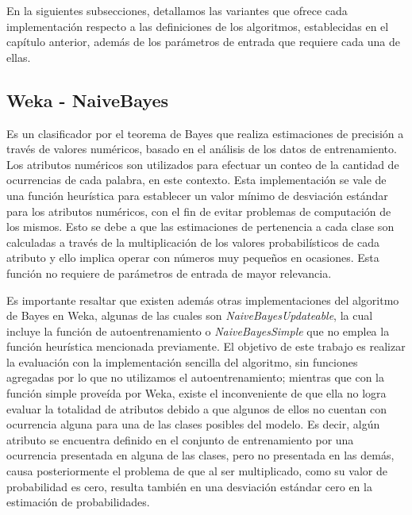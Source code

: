 En la siguientes subsecciones, detallamos las variantes que ofrece cada implementaci\'on respecto a las definiciones de los algoritmos, establecidas en el cap\'itulo anterior, adem\'as de los par\'ametros de entrada que requiere cada una de ellas.

\subsection{Weka - NaiveBayes}

Es un clasificador por el teorema de Bayes que realiza estimaciones de precisi\'on a trav\'es de valores num\'ericos, basado en el an\'alisis de los datos de entrenamiento. Los atributos num\'ericos son utilizados para efectuar un conteo de la cantidad de ocurrencias de cada palabra, en este contexto.  Esta implementaci\'on se vale de una funci\'on heur\'istica para establecer un valor m\'inimo de desviaci\'on est\'andar para los atributos num\'ericos, con el fin de evitar problemas de computaci\'on de los mismos. Esto se debe a que las estimaciones de pertenencia a cada clase son calculadas a trav\'es de la multiplicaci\'on de los valores probabil\'isticos de cada atributo y ello implica operar con n\'umeros muy peque\~nos en ocasiones. Esta funci\'on no requiere de par\'ametros de entrada de mayor relevancia.
\newline

Es importante resaltar que existen adem\'as otras implementaciones del algoritmo de Bayes en Weka, algunas de las cuales son \textit{NaiveBayesUpdateable}, la cual incluye la funci\'on de autoentrenamiento o \textit{NaiveBayesSimple} que no emplea la funci\'on heur\'istica mencionada previamente. El objetivo de este trabajo es realizar la evaluaci\'on con la implementaci\'on sencilla del algoritmo, sin funciones agregadas por lo que no utilizamos el autoentrenamiento; mientras que con la funci\'on simple prove\'ida por Weka, existe el inconveniente de que ella no logra evaluar la totalidad de atributos debido a que algunos de ellos no cuentan con ocurrencia alguna para una de las clases posibles del modelo. Es decir, alg\'un atributo se encuentra definido en el conjunto de entrenamiento por una ocurrencia presentada en alguna de las clases, pero no presentada en las dem\'as, causa posteriormente el problema de que al ser multiplicado, como su valor de probabilidad es cero, resulta tambi\'en en una desviaci\'on est\'andar cero en la estimaci\'on de probabilidades.
\newline

